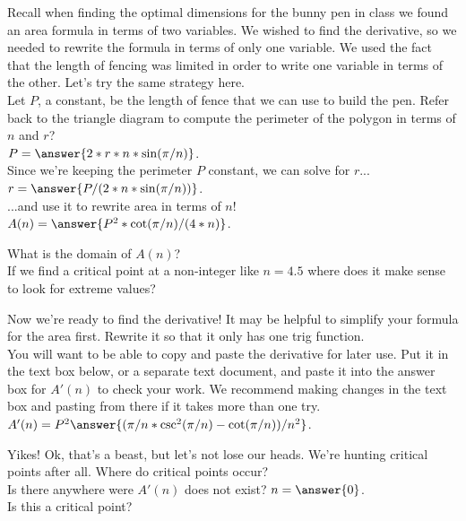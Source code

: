\documentclass[handout,nooutcomes]{ximera}
\begin{document}
\bigskip

Recall when finding the optimal dimensions for the bunny pen in class we found an area formula in terms of two variables. We wished to find the derivative, so we needed to rewrite the formula in terms of only one variable. We used the fact that the length of fencing was limited in order to write one variable in terms of the other. Let's try the same strategy here.\\
Let $P$, a constant, be the length of fence that we can use to build the pen. Refer back to the triangle diagram to compute the perimeter of the polygon in terms of $n$ and $r$?\\
$P = \answer{2*r*n*\sin(\pi/n)}$.\\
Since we're keeping the perimeter $P$ constant, we can solve for $r$...\\
$r = \answer{P/(2*n*\sin(\pi/n))}$.\\
...and use it to rewrite area in terms of $n$!
$A(n) = \answer{P^2*\cot(\pi/n)/(4*n)}$.\\

\bigskip

What is the domain of $A(n)$? \\ %
If we find a critical point at a non-integer like $n = 4.5$ where does it make sense to look for extreme values?\\ %

\bigskip

Now we're ready to find the derivative! It may be helpful to simplify your formula for the area first. Rewrite it so that it only has one trig function.\\
You will want to be able to copy and paste the derivative for later use. Put it in the text box below, or a separate text document, and paste it into the answer box for $A'(n)$ to check your work. We recommend making changes in the text box and pasting from there if it takes more than one try.\\
$A'(n) = P^2\answer{(\pi/n*\csc^2(\pi/n)-\cot(\pi/n))/n^2}$.\\

\bigskip

Yikes! Ok, that's a beast, but let's not lose our heads. We're hunting critical points after all. Where do critical points occur?\\ %
Is there anywhere were $A'(n)$ does not exist? $n = \answer{0}$.\\
Is this a critical point?\\ %
\end{document}
